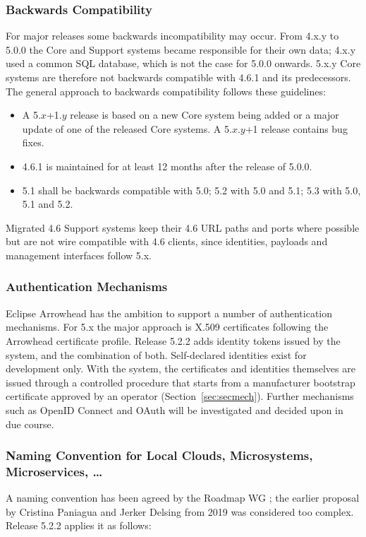 \documentclass[a4paper]{arrowhead}
\newcommand{\sys}[1]{\textcolor{ArrowheadBlue}{\textbf{\ahbreak{#1}}}}      %
\begin{document}
\subsubsection{Backwards Compatibility}
\label{sec:nfr:compat}
For major releases some backwards incompatibility may occur. From 4.x.y to 5.0.0 the Core and
Support systems became responsible for their own data; 4.x.y used a common SQL database, which is
not the case for 5.0.0 onwards. 5.x.y Core systems are therefore not backwards compatible with
4.6.1 and its predecessors. The general approach to backwards compatibility follows these
guidelines:
\begin{itemize}
  \item A 5.$x$+1.$y$ release is based on a new Core system being added or a major update of one
        of the released Core systems. A 5.$x$.$y$+1 release contains bug fixes.
  \item 4.6.1 is maintained for at least 12 months after the release of 5.0.0.
  \item 5.1 shall be backwards compatible with 5.0; 5.2 with 5.0 and 5.1; 5.3 with 5.0, 5.1 and
        5.2.
\end{itemize}
Migrated 4.6 Support systems keep their 4.6 URL paths and ports where possible but are not wire
compatible with 4.6 clients, since identities, payloads and management interfaces follow 5.x.

\subsubsection{Authentication Mechanisms}
Eclipse Arrowhead has the ambition to support a number of authentication mechanisms. For 5.x the
major approach is X.509 certificates following the Arrowhead certificate profile. Release 5.2.2
adds identity tokens issued by the \sys{Authentication} system, and the combination of both.
Self-declared identities exist for development only. With the \sys{Onboarding} system, the
certificates and identities themselves are issued through a controlled procedure that starts from
a manufacturer bootstrap certificate approved by an operator (Section~\ref{sec:secmech}). Further mechanisms such as OpenID Connect
and OAuth will be investigated and decided upon in due course.

\subsubsection{Naming Convention for Local Clouds, Microsystems, Microservices, \ldots}
\label{sec:nfr:naming}
A naming convention has been agreed by the Roadmap WG \cite{naming2}; the earlier proposal by
Cristina Paniagua and Jerker Delsing from 2019 was considered too complex. Release 5.2.2 applies
it as follows:
\end{document}
